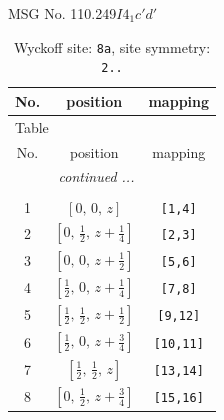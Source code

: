 \documentclass[fleqn,8pt]{jsarticle}
\begin{document}
\setcounter{MaxMatrixCols}{32}

\renewcommand{\tablename}{Table~}
\renewcommand{\figurename}{Figure~}
\begin{center}
\LARGE
MSG No. 110.249\quad$I4_{1}c'd'$
\end{center}
\renewcommand{\arraystretch}{1.2}
\begin{longtable}{ccc}
\caption{Wyckoff site: {\tt 8a}, site symmetry: {\tt 2..}}
 \\
 \hline \hline
No. & position & mapping \\ \hline \endfirsthead

\multicolumn{2}{l}{\tablename\ \thetable{}} \\
 \hline \hline
No. & position & mapping \\ \hline \endhead

 \hline \hline
\multicolumn{2}{r}{\footnotesize\it continued ...} \\ \endfoot

 \hline \hline
\multicolumn{2}{r}{} \\ \endlastfoot

1 & $\left[ 0,\, 0,\, z \right]$ & {\tt [1,4]} \\ \hline
2 & $\left[ 0,\, \frac{1}{2},\, z + \frac{1}{4} \right]$ & {\tt [2,3]} \\ \hline
3 & $\left[ 0,\, 0,\, z + \frac{1}{2} \right]$ & {\tt [5,6]} \\ \hline
4 & $\left[ \frac{1}{2},\, 0,\, z + \frac{1}{4} \right]$ & {\tt [7,8]} \\ \hline
5 & $\left[ \frac{1}{2},\, \frac{1}{2},\, z + \frac{1}{2} \right]$ & {\tt [9,12]} \\ \hline
6 & $\left[ \frac{1}{2},\, 0,\, z + \frac{3}{4} \right]$ & {\tt [10,11]} \\ \hline
7 & $\left[ \frac{1}{2},\, \frac{1}{2},\, z \right]$ & {\tt [13,14]} \\ \hline
8 & $\left[ 0,\, \frac{1}{2},\, z + \frac{3}{4} \right]$ & {\tt [15,16]} \\
\end{longtable}
\renewcommand{\arraystretch}{1.2}
\end{document}
